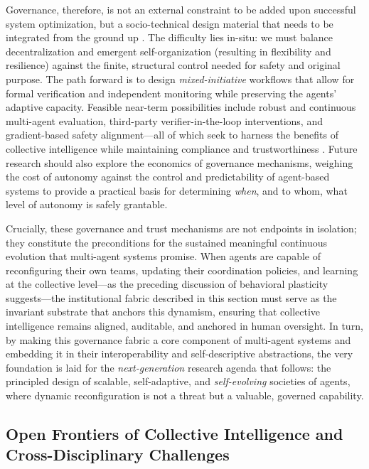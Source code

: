 \documentclass[11pt,a4paper]{article}
\begin{document}
Governance, therefore, is not an external constraint to be added upon successful system optimization, but a socio-technical design material that needs to be integrated from the ground up \cite{arxiv:1311.5108v1}. The difficulty lies in-situ: we must balance decentralization and emergent self-organization (resulting in flexibility and resilience) against the finite, structural control needed for safety and original purpose. The path forward is to design \emph{mixed-initiative} workflows that allow for formal verification and independent monitoring while preserving the agents' adaptive capacity. Feasible near-term possibilities include robust and continuous multi-agent evaluation, third-party verifier-in-the-loop interventions, and gradient-based safety alignment---all of which seek to harness the benefits of collective intelligence while maintaining compliance and trustworthiness \cite{arxiv:2407.18749v1,arxiv:1503.05317v1}. Future research should also explore the economics of governance mechanisms, weighing the cost of autonomy against the control and predictability of agent-based systems to provide a practical basis for determining \emph{when}, and to whom, what level of autonomy is safely grantable.

Crucially, these governance and trust mechanisms are not endpoints in isolation; they constitute the preconditions for the sustained meaningful continuous evolution that multi-agent systems promise. When agents are capable of reconfiguring their own teams, updating their coordination policies, and learning at the collective level---as the preceding discussion of behavioral plasticity suggests---the institutional fabric described in this section must serve as the invariant substrate that anchors this dynamism, ensuring that collective intelligence remains aligned, auditable, and anchored in human oversight. In turn, by making this governance fabric a core component of multi-agent systems and embedding it in their interoperability and self-descriptive abstractions, the very foundation is laid for the \emph{next-generation} research agenda that follows: the principled design of scalable, self-adaptive, and \emph{self-evolving} societies of agents, where dynamic reconfiguration is not a threat but a valuable, governed capability.


\subsection{Open Frontiers of Collective Intelligence and Cross-Disciplinary Challenges}
\end{document}
